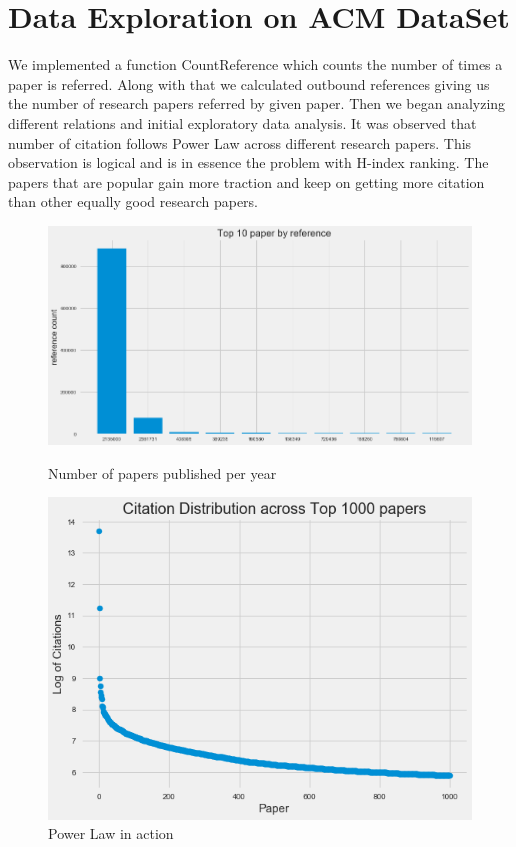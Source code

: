 \documentclass[a4paper, 11pt]{article}
\begin{document}
\section*{Data Exploration on ACM DataSet}
We implemented a function CountReference which counts the number of times a paper is referred. Along with that we calculated outbound references giving us the number of research papers referred by given paper. Then we began analyzing different relations and initial exploratory data analysis. It was observed that number of citation follows Power Law across different research papers. This observation is logical and is in essence the problem with H-index ranking. The papers that are popular gain more traction and keep on getting more citation than other equally good research papers.
\begin{figure}
    \centering
    \begin{minipage}{0.45\textwidth}
        \centering
        \includegraphics[width=1.1\textwidth]{top_10_papers.png}
        \caption{Number of papers published per year}
    \end{minipage}\hfill
    \begin{minipage}{0.45\textwidth}
        \centering
        \includegraphics[width=.9\textwidth]{power_law.png}
        \caption{Power Law in action}
    \end{minipage}
\end{figure}
\FloatBarrier
\\
\end{document}
